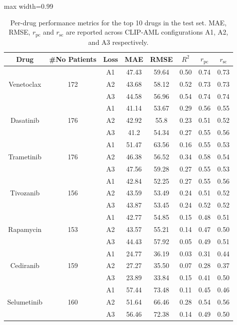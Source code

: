 \documentclass[sigconf,authordraft]{acmart}
\begin{document}
\begin{table}[!ht]
    \centering
    \caption{Per-drug performance metrics for the top 10 drugs in the test set. MAE, RMSE, $r_{\text{pc}}$ and $r_{\text{sc}}$ are reported across CLIP-AML configurations A1, A2, and A3 respectively.}
    \label{tab:tab_top10}
    \scriptsize
    \begin{adjustbox}{max width=0.99\linewidth}
    \begin{tabular}{|c|c|c|c|c|c|c|c|}
    \hline
        \textbf{Drug} & \textbf{\#No Patients} & \textbf{Loss} & \textbf{MAE} & \textbf{RMSE} & \textbf{$R^{2}$} &  $r_{\text{pc}}$ & $r_{\text{sc}}$ \\
         \hline
 & & A1 & 47.43 & 59.64 & 0.50 & 0.74 & 0.73 \\
Venetoclax & 172 & A2 & 43.68 & 58.12 & 0.52 & 0.73 & 0.73  \\
&  & A3 & 44.58 & 56.96 & 0.54 & 0.74 & 0.74 \\ \hline
& & A1 & 41.14 & 53.67 & 0.29 & 0.56 & 0.55 \\
Dasatinib & 176 & A2 & 42.92 & 55.8 & 0.23 & 0.51 & 0.52 \\
& & A3 & 41.2 & 54.34 & 0.27 & 0.55 & 0.56 \\ \hline
& & A1 & 51.47 & 63.56 & 0.16 & 0.55 & 0.53 \\
Trametinib & 176 & A2 & 46.38 & 56.52 & 0.34 & 0.58 & 0.54 \\
 & & A3 & 47.56 & 59.28 & 0.27 & 0.55 & 0.53 \\ \hline
 & & A1 & 42.84 & 52.25 & 0.27 & 0.55 & 0.56 \\
Tivozanib  & 156 & A2 & 43.59 & 53.49 & 0.24 & 0.51 & 0.52 \\
& & A3 & 43.87 & 53.45 & 0.24 & 0.52 & 0.52 \\ \hline
 & & A1 & 42.77 & 54.85 & 0.15 & 0.48 & 0.51 \\ 
Rapamycin & 153 & A2 & 43.57 & 55.21 & 0.14 & 0.47 & 0.50 \\
 & & A3 & 44.43 & 57.92 & 0.05 & 0.49 & 0.51 \\ \hline
&  & A1 & 24.77 & 36.19 & 0.03 & 0.31 & 0.44 \\
Cediranib & 159 & A2 & 27.27 & 35.50 & 0.07 & 0.28 & 0.37 \\
& & A3 & 23.89 & 33.84 & 0.15 & 0.41 & 0.50 \\ \hline
 & & A1 & 57.44 & 73.48 & 0.11 & 0.45 & 0.46 \\
Selumetinib  & 160 & A2 & 51.64 & 66.46 & 0.28 & 0.54 & 0.56 \\
 & & A3 & 56.46 & 72.38 & 0.14 & 0.49 & 0.50 \\ \hline

\end{tabular}
\end{adjustbox}
\end{table}
\end{document}
